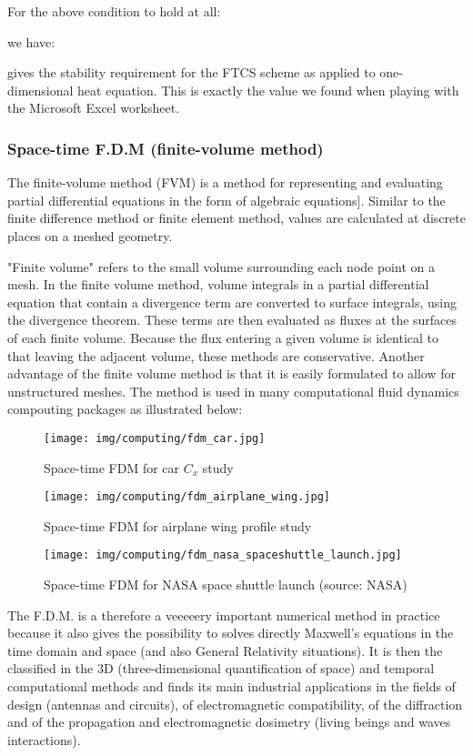 	For the above condition to hold at all:
	
	we have:
	
	gives the stability requirement for the FTCS scheme as applied to one-dimensional heat equation. This is exactly the value we found when playing with the Microsoft Excel worksheet.
	
	\subsubsection{Space-time F.D.M (finite-volume method)}
	The finite-volume method (FVM) is a method for representing and evaluating partial differential equations in the form of algebraic equations]. Similar to the finite difference method or finite element method, values are calculated at discrete places on a meshed geometry. 
	
	"Finite volume" refers to the small volume surrounding each node point on a mesh. In the finite volume method, volume integrals in a partial differential equation that contain a divergence term are converted to surface integrals, using the divergence theorem. These terms are then evaluated as fluxes at the surfaces of each finite volume. Because the flux entering a given volume is identical to that leaving the adjacent volume, these methods are conservative. Another advantage of the finite volume method is that it is easily formulated to allow for unstructured meshes. The method is used in many computational fluid dynamics compouting packages as illustrated below:
	\begin{figure}[H]
		\centering
		\texttt{[image: img/computing/fdm\_car.jpg]}
		\caption{Space-time FDM for car $C_x$ study}
	\end{figure}
	\begin{figure}[H]
		\centering
		\texttt{[image: img/computing/fdm\_airplane\_wing.jpg]}
		\caption{Space-time FDM for airplane wing profile study}
	\end{figure}
	\begin{figure}[H]
		\centering
		\texttt{[image: img/computing/fdm\_nasa\_spaceshuttle\_launch.jpg]}
		\caption{Space-time FDM for NASA space shuttle launch (source: NASA)}
	\end{figure}
	The F.D.M. is a therefore a veeeeery important numerical method in practice because it also gives the possibility to solves directly Maxwell's equations in the time domain and space (and also General Relativity situations). It is then the classified in the $3$D (three-dimensional quantification of space) and temporal computational methods and finds its main industrial applications in the fields of design (antennas and circuits), of electromagnetic compatibility, of the diffraction and of the propagation and electromagnetic dosimetry (living beings and waves interactions).
	
